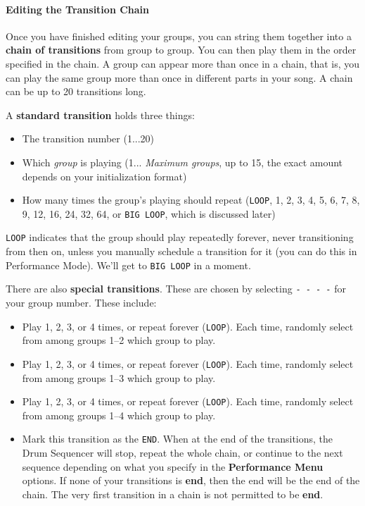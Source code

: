 \documentclass{article}
\begin{document}
\paragraph{Editing the Transition Chain}

Once you have finished editing your groups, you can string them together into a {\bf chain of transitions} from group to group.  You can then play them in the order specified in the chain.   A group can appear more than once in a chain, that is, you can play the same group more than once in different parts in your song.  A chain can be up to 20 transitions long.

A {\bf standard transition} holds three things:

\begin{itemize}
\item The transition number (1...20)
\item Which {\it group} is playing (1... {\it Maximum groups}, up to 15, the exact amount depends on your initialization format)
\item How many times the group's playing should repeat (\texttt{LOOP}, 1, 2, 3, 4, 5, 6, 7, 8, 9, 12, 16, 24, 32, 64, or \texttt{BIG~LOOP}, which is discussed later)
\end{itemize}

{\tt LOOP} indicates that the group should play repeatedly forever, never transitioning from then on, unless you manually schedule a transition for it (you can do this in Performance Mode).  We'll get to {\tt BIG LOOP} in a moment.

There are also {\bf special transitions}.  These are chosen by selecting {\tt - - - -} for your group number.  These include:

\begin{itemize}
\item Play 1, 2, 3, or 4 times, or repeat forever (\texttt{LOOP}).  Each time, randomly select from among groups 1--2 which group to play.
\item Play 1, 2, 3, or 4 times, or repeat forever (\texttt{LOOP}).  Each time, randomly select from among groups 1--3 which group to play.  
\item Play 1, 2, 3, or 4 times, or repeat forever (\texttt{LOOP}).  Each time, randomly select from among groups 1--4 which group to play.
\item Mark this transition as the {\texttt{END}}.  When at the end of the transitions, the Drum Sequencer will stop, repeat the whole chain, or continue to the next sequence depending on what you specify in the {\bf Performance Menu} options.  If none of your transitions is {\bf end}, then the end will be the end of the chain.   The very first transition in a chain is not permitted to be {\bf end}.
\end{itemize}
\end{document}
